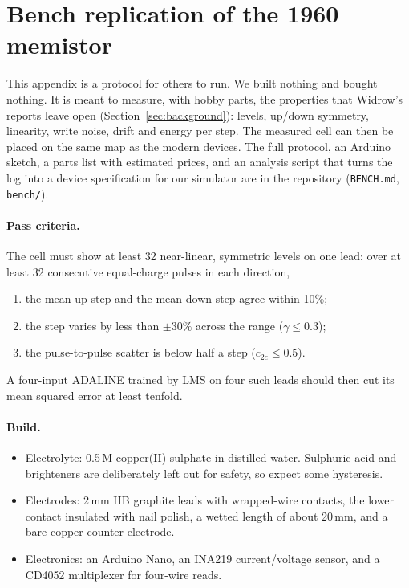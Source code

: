 \section{Bench replication of the 1960 memistor}\label{app:bench}
This appendix is a protocol for others to run. We built nothing and bought nothing. It is meant to measure, with hobby parts, the
properties that Widrow's reports leave open (Section~\ref{sec:background}): levels, up/down symmetry, linearity, write noise,
drift and energy per step. The measured cell can then be placed on the same map as the modern devices. The full protocol, an
Arduino sketch, a parts list with estimated prices, and an analysis script that turns the log into a device specification for
our simulator are in the repository (\texttt{BENCH.md}, \texttt{bench/}).

\paragraph{Pass criteria.} The cell must show at least 32 near-linear, symmetric levels on one lead: over at least 32
consecutive equal-charge pulses in each direction,
\begin{enumerate}
\item the mean up step and the mean down step agree within 10\%;
\item the step varies by less than $\pm30\%$ across the range ($\gamma\le0.3$);
\item the pulse-to-pulse scatter is below half a step ($c_{2c}\le0.5$).
\end{enumerate}
A four-input ADALINE trained by LMS on four such leads should then cut its mean squared error at least tenfold.

\paragraph{Build.}
\begin{itemize}
\item Electrolyte: 0.5\,M copper(II) sulphate in distilled water. Sulphuric acid and brighteners are deliberately left out for
      safety, so expect some hysteresis.
\item Electrodes: 2\,mm HB graphite leads with wrapped-wire contacts, the lower contact insulated with nail polish, a wetted
      length of about 20\,mm, and a bare copper counter electrode.
\item Electronics: an Arduino Nano, an INA219 current/voltage sensor, and a CD4052 multiplexer for four-wire reads.
\end{itemize}

